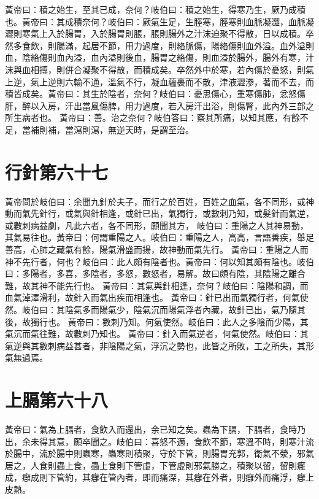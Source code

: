 黃帝曰：積之始生，至其已成，奈何？岐伯曰：積之始生，得寒乃生，厥乃成積也。黃帝曰：其成積奈何？岐伯曰：厥氣生足，生脛寒，脛寒則血脈凝澀，血脈凝澀則寒氣上入於腸胃，入於腸胃則脹，脹則腸外之汁沫迫聚不得散，日以成積。卒然多食飲，則腸滿，起居不節，用力過度，則絡脈傷，陽絡傷則血外溢。血外溢則血，陰絡傷則血內溢，血內溢則後血，腸胃之絡傷，則血溢於腸外，腸外有寒，汁沫與血相搏，則併合凝聚不得散，而積成矣。卒然外中於寒，若內傷於憂怒，則氣上逆，氣上逆則六輸不通，溫氣不行，凝血蘊裹而不散，津液澀滲，著而不去，而積皆成矣。黃帝曰：其生於陰者，奈何？岐伯曰：憂思傷心，重寒傷肺，忿怒傷肝，醉以入房，汗出當風傷脾，用力過度，若入房汗出浴，則傷腎，此內外三部之所生病者也。
黃帝曰：善。治之奈何？岐伯答曰：察其所痛，以知其應，有餘不足，當補則補，當瀉則瀉，無逆天時，是謂至治。



\section{行針第六十七}

黃帝問於岐伯曰：余聞九針於夫子，而行之於百姓，百姓之血氣，各不同形，或神動而氣先針行，或氣與針相逢，或針已出，氣獨行，或數刺乃知，或髮針而氣逆，或數刺病益劇，凡此六者，各不同形，願聞其方，
岐伯曰：重陽之人其神易動，其氣易往也。黃帝曰：何謂重陽之人。岐伯曰：重陽之人，高高，言語善疾，舉足善高，心肺之藏氣有餘，陽氣滑盛而揚，故神動而氣先行。
黃帝曰：重陽之人而神不先行者，何也？岐伯曰：此人頗有陰者也。黃帝曰：何以知其頗有陰也。岐伯曰：多陽者，多喜，多陰者，多怒，數怒者，易解。故曰頗有陰，其陰陽之離合難，故其神不能先行也。
黃帝曰：其氣與針相逢，奈何？岐伯曰：陰陽和調，而血氣淖澤滑利，故針入而氣出疾而相逢也。
黃帝曰：針已出而氣獨行者，何氣使然。岐伯曰：其陰氣多而陽氣少，陰氣沉而陽氣浮者內藏，故針已出，氣乃隨其後，故獨行也。
黃帝曰：數刺乃知。何氣使然。岐伯曰：此人之多陰而少陽，其氣沉而氣往難，故數刺乃知也。
黃帝曰：針入而氣逆者，何氣使然。岐伯曰：其氣逆與其數刺病益甚者，非陰陽之氣，浮沉之勢也，此皆之所敗，工之所失，其形氣無過焉。



\section{上膈第六十八}

黃帝曰：氣為上膈者，食飲入而還出，余已知之矣。蟲為下膈，下膈者，食時乃出，余未得其意，願卒聞之。岐伯曰：喜怒不適，食飲不節，寒溫不時，則寒汁流於腸中，流於腸中則蟲寒，蟲寒則積聚，守於下管，則腸胃充郭，衛氣不滎，邪氣居之，人食則蟲上食，蟲上食則下管虛，下管虛則邪氣勝之，積聚以留，留則癰成，癰成則下管約，其癰在管內者，即而痛深，其癰在外者，則癰外而痛浮，癰上皮熱。

